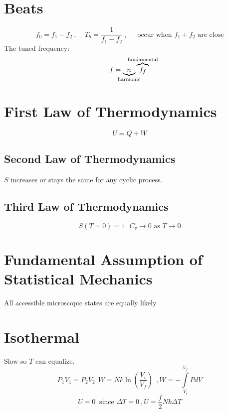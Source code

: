 \documentclass[10pt,letter]{article}
\begin{document}
\section{Beats} %
\label{sec:beats}
\begin{equation}
    f_0 = f_1 - f_2 ~, ~~~~~ T_b = \frac{1}{f_1-f_2}~,~~~~~\textrm{ occur when }f_1 + f_2 \textrm{ are close}
\end{equation}
The tuned frequency:
\begin{equation}
    f = \underbrace{n}_{\mathclap{\textrm{harmonic}}}\overbrace{f_f}^{\mathclap{\textrm{fundamental}}}
\end{equation}

\section{First Law of Thermodynamics} %
\label{sec:first_law_of_thermo}
\begin{equation}
    U = Q + W
\end{equation}
\subsection{Second Law of Thermodynamics} %
\label{sub:second_law_of_thermo}
$S$ increases or stays the same for any cyclic process. 
\subsection{Third Law of Thermodynamics} %
\label{sub:third_law_of_thermo}
\begin{equation}
    S(T=0)=1~~~ C_v \rightarrow 0 \textrm{ as } T \rightarrow 0
\end{equation}

\section{Fundamental Assumption of Statistical Mechanics} %
\label{sec:fundamental_assumption_of_statistical_mechanics}
All accessible microscopic states are equally likely

\section{Isothermal} %
\label{sec:isothermal}
Slow so $T$ can equalize.
\begin{equation}
    P_1V_1 = P_2V_2~~W = Nk\ln \left( \frac{V_i}{V_f} \right) ~~, W = -\int \limits_{V_i}^{V_f}PdV
\end{equation}
\begin{equation}
    U=0~ \textrm{ since }\Delta T=0~, U = \frac{f}{2}Nk \Delta T
\end{equation}
\end{document}
